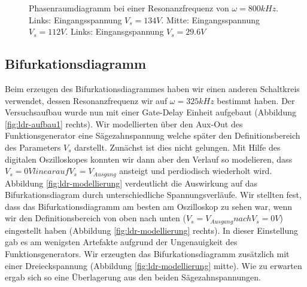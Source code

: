 \documentclass[12pt,a4paper]{article}
\begin{document}
\begin{figure}[!htbp]
\caption{Phasenraumdiagramm bei einer Resonanzfrequenz von $\omega=800kHz$. Links: Eingangsspannung $V_s=134V$. Mitte: Eingangsspannung $V_s=112V$. Links: Eingansgspannung $V_s=29.6V$}
\label{fig:ldr-real2}
\end{figure}
\subsection { Bifurkationsdiagramm }
Beim erzeugen des Bifurkationsdiagrammes haben wir einen anderen Schaltkreis verwendet, dessen Resonanzfrequenz wir auf $\omega=325kHz$ bestimmt haben. Der Versuchsaufbau wurde nun mit einer Gate-Delay Einheit aufgebaut (Abbildung \ref{fig:ldr-aufbau1} rechts). Wir modellierten über den Aux-Out des Funktionsgenerator eine Sägezahnspannung welche später den Definitionsbereich des Parameters $V_s$ darstellt. 
Zunächst ist dies nicht gelungen. Mit Hilfe des digitalen Oszilloskopes konnten wir dann aber den Verlauf so modelieren, dass  $V_s=0V linear auf V_s=V_{Ausgang}$ ansteigt und perdiodisch wiederholt wird.
Abbildung \ref{fig:ldr-modellierung} verdeutlicht die Auswirkung auf das Bifurkationsdiagram durch unterschiedliche Spannungsverläufe.
Wir stellten fest, dass das Bifurkationsdiagramm am besten am Oszilloskop zu sehen war, wenn wir den Definitionsbereich von oben nach unten ($V_s=V_{Ausgang} nach V_s=0V$) eingestellt haben (Abbildung \ref{fig:ldr-modellierung} rechts). In dieser Einstellung gab es am wenigsten Artefakte aufgrund der Ungenauigkeit des Funktionsgenerators. Wir erzeugten das Bifurkationsdiagramm zusätzlich mit einer Dreieckspannung (Abbildung \ref{fig:ldr-modellierung} mitte). Wie zu erwarten ergab sich so eine Überlagerung aus den beiden Sägezahnspannungen. 
\end{document}
